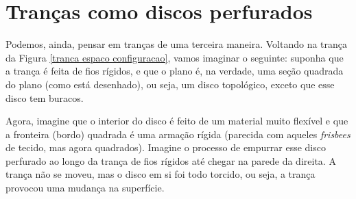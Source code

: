 	\section{Tranças como discos perfurados}\label{secao trancas como discos perfurados}
	Podemos, ainda, pensar em tranças de uma terceira maneira. Voltando na trança da 
	Figura \ref{tranca espaco configuracao}, vamos imaginar o seguinte: suponha que a 
	trança é feita de fios rígidos, e que o plano é, na verdade, uma seção quadrada do plano 
	(como está desenhado), ou seja, um disco topológico, exceto que esse disco tem buracos.
	
	\par\vspace{0.3cm} Agora, imagine que o interior do disco é feito de um material muito flexível 
	e que a fronteira (bordo) quadrada é uma armação rígida (parecida com aqueles \textit{frisbees} 
	de tecido, mas agora quadrados). Imagine o processo de empurrar esse disco perfurado ao longo da 
	trança de fios rígidos até chegar na parede da direita. A trança não se moveu, mas o disco em si 
	foi todo torcido, ou seja, a trança provocou uma mudança na superfície.
	
